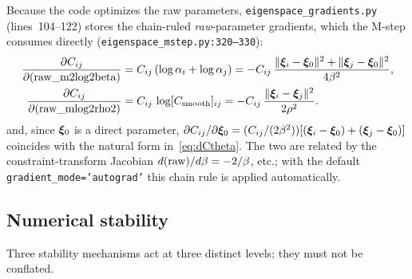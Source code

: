 \begin{remark}
Because the code optimizes the raw parameters, \texttt{eigenspace\_gradients.py}
(lines~104--122) stores the chain-ruled \emph{raw}-parameter gradients, which the
M-step consumes directly (\texttt{eigenspace\_mstep.py:320--330}):
\begin{equation}
\begin{aligned}
\frac{\partial C_{ij}}{\partial(\text{raw\_m2log2beta})}
&=C_{ij}\,(\log\alpha_i+\log\alpha_j)
=-C_{ij}\,\frac{\lVert\bm{\xi}_i-\bm{\xi}_{0}\rVert^2+\lVert\bm{\xi}_j-\bm{\xi}_{0}\rVert^2}{4\beta^2},\\
\frac{\partial C_{ij}}{\partial(\text{raw\_mlog2rho2})}
&=C_{ij}\,\log[C_{\mathrm{smooth}}]_{ij}
=-C_{ij}\,\frac{\lVert\bm{\xi}_i-\bm{\xi}_j\rVert^2}{2\rho^2}.
\end{aligned}
\end{equation}
and, since $\bm{\xi}_{0}$ is a direct parameter,
$\partial C_{ij}/\partial\bm{\xi}_{0}=(C_{ij}/(2\beta^2))[(\bm{\xi}_i-\bm{\xi}_{0})+(\bm{\xi}_j-\bm{\xi}_{0})]$
coincides with the natural form in~\eqref{eq:dCtheta}. The two are related by the
constraint-transform Jacobian $d(\text{raw})/d\beta=-2/\beta$, etc.; with the
default \texttt{gradient\_mode='autograd'} this chain rule is applied automatically.
\end{remark}

\subsection{Numerical stability}
\label{subsec:numstab}

Three stability mechanisms act at three distinct levels; they must not be conflated.

